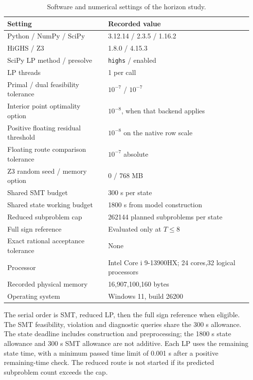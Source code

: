 \begin{table}[htbp]
\caption{Software and numerical settings of the horizon study.}\label{tab:solver_settings}
\begin{tabularx}{\linewidth}{@{}p{.43\linewidth} X@{}}\toprule
Setting & Recorded value\\\midrule
Python / NumPy / SciPy & 3.12.14 / 2.3.5 / 1.16.2\\
HiGHS / Z3 & 1.8.0 / 4.15.3\\
SciPy LP method / presolve & \texttt{highs} / enabled\\
LP threads & 1 per call\\
Primal / dual feasibility tolerance & $10^{-7}$ / $10^{-7}$\\
Interior point optimality option & $10^{-8}$, when that backend applies\\
Positive floating residual threshold & $10^{-8}$ on the native row scale\\
Floating route comparison tolerance & $10^{-7}$ absolute\\
Z3 random seed / memory option & 0 / 768 MB\\
Shared SMT budget & 300 s per state\\
Shared state working budget & 1800 s from model construction\\
Reduced subproblem cap & 262144 planned subproblems per state\\
Full sign reference & Evaluated only at $T\leq8$\\
Exact rational acceptance tolerance & None\\
Processor & Intel Core i 9-13900HX; 24 cores,32 logical processors\\
Recorded physical memory & 16,907,100,160 bytes\\
Operating system & Windows 11, build 26200\\
\bottomrule\end{tabularx}
\end{table}

The serial order is SMT, reduced LP, then the full sign reference when
eligible. The SMT feasibility, violation and diagnostic queries share the
300 s allowance. The state deadline includes construction and preprocessing;
the 1800 s state allowance and 300 s SMT allowance are not additive.
Each LP uses the remaining state time, with a minimum passed time limit of
0.001 s after a positive remaining-time check. The reduced route is not
started if its predicted subproblem count exceeds the cap.

